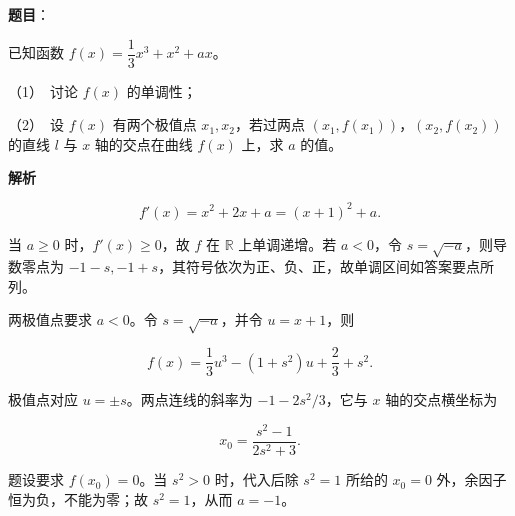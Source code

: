 \begin{answer}

\textbf{题目}：

已知函数 $f(x)=\dfrac13x^3+x^2+ax$。

（1）　讨论 $f(x)$ 的单调性；

（2）　设 $f(x)$ 有两个极值点 $x_1,x_2$，若过两点 $(x_1,f(x_1))$，$(x_2,f(x_2))$ 的直线 $l$ 与 $x$ 轴的交点在曲线 $f(x)$ 上，求 $a$ 的值。

\textbf{解析}


\nopagebreak[4]
\[
f'(x)=x^2+2x+a=(x+1)^2+a.
\]

当 $a\geq0$ 时，$f'(x)\geq0$，故 $f$ 在 $\mathbb R$ 上单调递增。若 $a<0$，令 $s=\sqrt{-a}$，则导数零点为 $-1-s,-1+s$，其符号依次为正、负、正，故单调区间如答案要点所列。


两极值点要求 $a<0$。令 $s=\sqrt{-a}$，并令 $u=x+1$，则

\nopagebreak[4]
\[
f(x)=\frac13u^3-(1+s^2)u+\frac23+s^2.
\]

极值点对应 $u=\pm s$。两点连线的斜率为 $-1-2s^2/3$，它与 $x$ 轴的交点横坐标为

\nopagebreak[4]
\[
x_0=\frac{s^2-1}{2s^2+3}.
\]

题设要求 $f(x_0)=0$。当 $s^2>0$ 时，代入后除 $s^2=1$ 所给的 $x_0=0$ 外，余因子恒为负，不能为零；故 $s^2=1$，从而 $a=-1$。



\end{answer}
